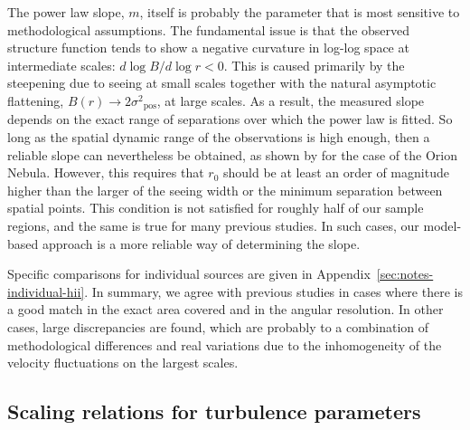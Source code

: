 \documentclass[fleqn,usenatbib, useAMS, a4paper]{mnras}
\newcommand\pos{\ensuremath{_{\mathrm{pos}}}}
\begin{document}
The power law slope, \(m\), itself is probably the parameter that
is most sensitive to methodological assumptions.
The fundamental issue is that the observed structure function tends to
show a negative curvature in log-log space at intermediate scales:
\(d\log B/ d\log r < 0\).
This is caused primarily by the steepening due to seeing at small scales
together with the natural asymptotic flattening, 
\(B(r) \to 2 \sigma^2\pos\), at large scales.
As a result, the measured slope depends on the exact range of
separations over which the power law is fitted.
So long as the spatial dynamic range of the observations is high enough,
then a reliable slope can nevertheless be obtained,
as shown by \citet{arthur2016turbulence} for the case of the Orion Nebula.
However, this requires that \(r_0\) should be at least an order of
magnitude higher than the larger of the seeing width
or the minimum separation between spatial points.
This condition is not satisfied for roughly half of our sample regions,
and the same is true for many previous studies.
In such cases, our model-based approach is a more reliable way of
determining the slope. 


Specific comparisons for individual sources are given
in Appendix~\ref{sec:notes-individual-hii}.
In summary, we agree with previous studies in cases where there
is a good match in the exact area covered and in the angular resolution.
In other cases, large discrepancies are found,
which are probably to a combination of methodological differences
and real variations due to the inhomogeneity of the
velocity fluctuations on the largest scales.

\subsection{Scaling relations for turbulence parameters}\label{sec:scaling-relations}
\end{document}
